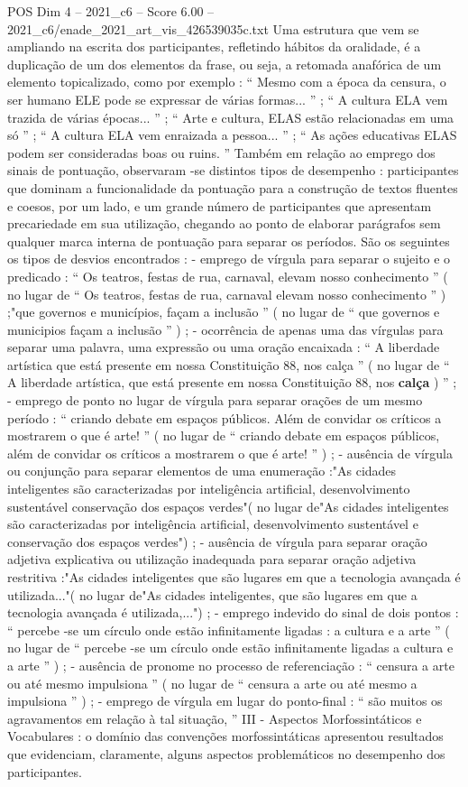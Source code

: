 \begin{textsample}{POS Dim 4 – 2021\_c6 – Score 6.00 – 2021\_c6/enade\_2021\_art\_vis\_426539035c.txt}
Uma estrutura que vem se ampliando na escrita dos participantes, refletindo hábitos da oralidade, é a duplicação de um dos elementos da frase, ou seja, a retomada anafórica de um elemento topicalizado, como por exemplo : “ Mesmo com a época da censura, o ser humano ELE pode se expressar de várias formas... ” ; “ A cultura ELA vem trazida de várias épocas... ” ; “ Arte e cultura, ELAS estão relacionadas em uma só ” ; “ A cultura ELA vem enraizada a pessoa... ” ; “ As ações educativas ELAS podem ser consideradas boas ou ruins. ” Também em relação ao emprego dos sinais de pontuação, observaram -se distintos tipos de desempenho : participantes que dominam a funcionalidade da pontuação para a construção de textos fluentes e coesos, por um lado, e um grande número de participantes que apresentam precariedade em sua utilização, chegando ao ponto de elaborar parágrafos sem qualquer marca interna de pontuação para separar os períodos.
São os seguintes os tipos de desvios encontrados : - emprego de vírgula para separar o sujeito e o predicado : “ Os teatros, festas de rua, carnaval, elevam nosso conhecimento ” ( no lugar de “ Os teatros, festas de rua, carnaval elevam nosso conhecimento ” ) ;"que governos e municípios, façam a inclusão ” ( no lugar de “ que governos e municipios façam a inclusão ” ) ; - ocorrência de apenas uma das vírgulas para separar uma palavra, uma expressão ou uma oração encaixada : “ A liberdade artística que está presente em nossa Constituição 88, nos calça ” ( no lugar de “ A liberdade artística, que está presente em nossa Constituição 88, nos \textbf{calça} ) ” ; - emprego de ponto no lugar de vírgula para separar orações de um mesmo período : “ criando debate em espaços públicos.
Além de convidar os críticos a mostrarem o que é arte! ” ( no lugar de “ criando debate em espaços públicos, além de convidar os críticos a mostrarem o que é arte! ” ) ; - ausência de vírgula ou conjunção para separar elementos de uma enumeração :"As cidades inteligentes são caracterizadas por inteligência artificial, desenvolvimento sustentável conservação dos espaços verdes"( no lugar de"As cidades inteligentes são caracterizadas por inteligência artificial, desenvolvimento sustentável e conservação dos espaços verdes") ; - ausência de vírgula para separar oração adjetiva explicativa ou utilização inadequada para separar oração adjetiva restritiva :"As cidades inteligentes que são lugares em que a tecnologia avançada é utilizada..."( no lugar de"As cidades inteligentes, que são lugares em que a tecnologia avançada é utilizada,...") ; - emprego indevido do sinal de dois pontos : “ percebe -se um círculo onde estão infinitamente ligadas : a cultura e a arte ” ( no lugar de “ percebe -se um círculo onde estão infinitamente ligadas a cultura e a arte ” ) ; - ausência de pronome no processo de referenciação : “ censura a arte ou até mesmo impulsiona ” ( no lugar de “ censura a arte ou até mesmo a impulsiona ” ) ; - emprego de vírgula em lugar do ponto-final : “ são muitos os agravamentos em relação à tal situação, ” III - Aspectos Morfossintáticos e Vocabulares : o domínio das convenções morfossintáticas apresentou resultados que evidenciam, claramente, alguns aspectos problemáticos no desempenho dos participantes.

\end{textsample}

